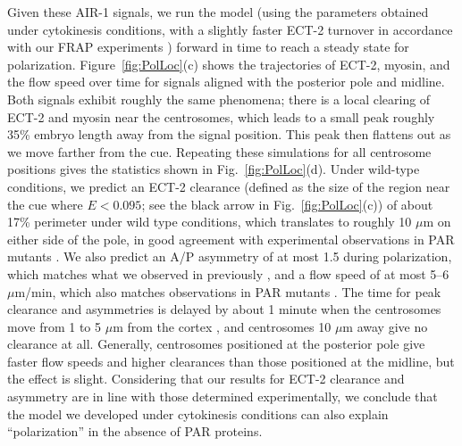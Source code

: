 \documentclass[11pt]{article}
\begin{document}
Given these AIR-1 signals, we run the model (using the parameters obtained under cytokinesis conditions, with a slightly faster ECT-2 turnover in accordance with our FRAP experiments \citep[Fig.~3D]{longhini2022aurora}) forward in time to reach a steady state for polarization. Figure\ \ref{fig:PolLoc}(c) shows the trajectories of ECT-2, myosin, and the flow speed over time for signals aligned with the posterior pole and midline. Both signals exhibit roughly the same phenomena; there is a local clearing of ECT-2 and myosin near the centrosomes, which leads to a small peak roughly 35\% embryo length away from the signal position. This peak then flattens out as we move farther from the cue. Repeating these simulations for all centrosome positions gives the statistics shown in Fig.\ \ref{fig:PolLoc}(d). Under wild-type conditions, we predict an ECT-2 clearance (defined as the size of the region near the cue where $E < 0.095$; see the black arrow in Fig.\ \ref{fig:PolLoc}(c)) of about 17\% perimeter under wild type conditions, which translates to roughly 10 $\mu$m on either side of the pole, in good agreement with experimental observations in PAR mutants \citep[Fig.~2E]{gross2019guiding}. We also predict an A/P asymmetry of at most 1.5 during polarization, which matches what we observed in previously \citep[Fig.~1]{longhini2022aurora}, and a flow speed of at most 5--6 $\mu$m/min, which also matches observations in PAR mutants \citep[Fig.~2G]{gross2019guiding}. The time for peak clearance and asymmetries is delayed by about 1 minute when the centrosomes move from 1 to 5 $\mu$m from the cortex \citep[Fig.~3F]{bienkowska2012centrosomes}, and centrosomes 10 $\mu$m away give no clearance at all. Generally, centrosomes positioned at the posterior pole give faster flow speeds and higher clearances than those positioned at the midline, but the effect is slight. Considering that our results for ECT-2 clearance and asymmetry are in line with those determined experimentally, we conclude that the model we developed under cytokinesis conditions can also explain ``polarization'' in the absence of PAR proteins.
\end{document}
